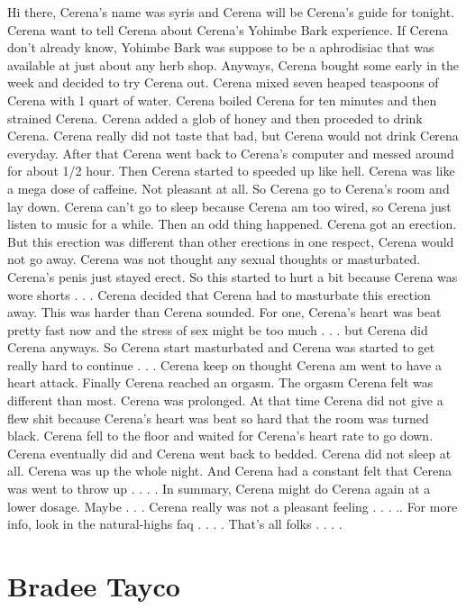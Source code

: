 \documentclass[12pt]{book}
\begin{document}
Hi there, Cerena's name was syris and Cerena will be Cerena's guide for tonight. Cerena want to tell Cerena about Cerena's Yohimbe Bark experience. If Cerena don't already know, Yohimbe Bark was suppose to be a aphrodisiac that was available at just about any herb shop. Anyways, Cerena bought some early in the week and decided to try Cerena out. Cerena mixed seven heaped teaspoons of Cerena with 1 quart of water. Cerena boiled Cerena for ten minutes and then strained Cerena. Cerena added a glob of honey and then proceded to drink Cerena. Cerena really did not taste that bad, but Cerena would not drink Cerena everyday. After that Cerena went back to Cerena's computer and messed around for about 1/2 hour. Then Cerena started to speeded up like hell. Cerena was like a mega dose of caffeine. Not pleasant at all. So Cerena go to Cerena's room and lay down. Cerena can't go to sleep because Cerena am too wired, so Cerena just listen to music for a while. Then an odd thing happened. Cerena got an erection. But this erection was different than other erections in one respect, Cerena would not go away. Cerena was not thought any sexual thoughts or masturbated. Cerena's penis just stayed erect. So this started to hurt a bit because Cerena was wore shorts . . .  Cerena decided that Cerena had to masturbate this erection away. This was harder than Cerena sounded. For one, Cerena's heart was beat pretty fast now and the stress of sex might be too much . . .  but Cerena did Cerena anyways. So Cerena start masturbated and Cerena was started to get really hard to continue . . .  Cerena keep on thought Cerena am went to have a heart attack. Finally Cerena reached an orgasm. The orgasm Cerena felt was different than most. Cerena was prolonged. At that time Cerena did not give a flew shit because Cerena's heart was beat so hard that the room was turned black. Cerena fell to the floor and waited for Cerena's heart rate to go down. Cerena eventually did and Cerena went back to bedded. Cerena did not sleep at all. Cerena was up the whole night. And Cerena had a constant felt that Cerena was went to throw up . . .  . In summary, Cerena might do Cerena again at a lower dosage. Maybe . . .  Cerena really was not a pleasant feeling . . . .. For more info, look in the natural-highs faq . . .  . That's all folks . . .  .



\chapter{Bradee Tayco}
\end{document}
